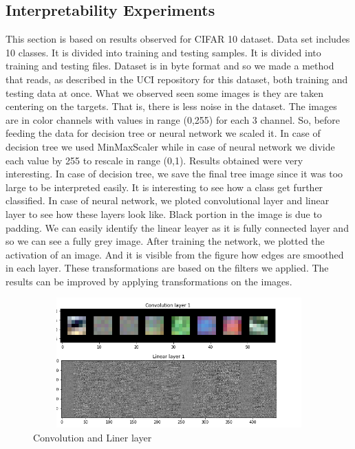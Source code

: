 \documentclass[10pt,twocolumn,letterpaper]{article}
\begin{document}
\subsection{Interpretability Experiments}

This section is based on results observed for CIFAR 10 dataset. Data set includes 10 classes. It is divided into training and testing samples. It is divided into training and testing files. Dataset is in byte format and so we made a method that reads, as described in the UCI repository for this dataset, both training and testing data at once. What we observed seen some images is they are taken centering on the targets. That is, there is less noise in the dataset. The images are in color channels with values in range (0,255) for each 3 channel. So, before feeding the data for decision tree or neural network we scaled it. In case of decision tree we used MinMaxScaler while in case of neural network we divide each value by 255 to rescale in range (0,1). Results obtained were very interesting. In case of decision tree, we save the final tree image since it was too large to be interpreted easily. It is interesting to see how a class get further classified. In case of neural network, we ploted convolutional layer and linear layer to see how these layers look like. Black portion in the image is due to padding. We can easily identify the linear leayer as it is fully connected layer and so we can see a fully grey image. After training the network, we plotted the activation of an image. And it is visible from the figure how edges are smoothed in each layer. These transformations are based on the filters we applied. The results can be improved by applying transformations on the images.
\begin{figure}
   \begin{center}
   \includegraphics[width=15cm,height=5cm,keepaspectratio]{layer1.png}
   \end{center}
      \caption{Convolution and Liner layer\label{activation}}
\end{figure}
\end{document}
